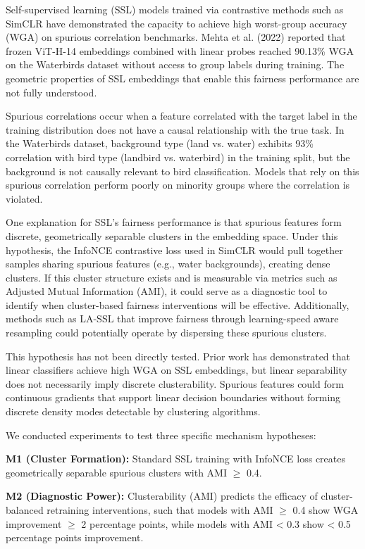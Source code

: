 
Self-supervised learning (SSL) models trained via contrastive methods such as SimCLR have demonstrated the capacity to achieve high worst-group accuracy (WGA) on spurious correlation benchmarks. Mehta et al. (2022) reported that frozen ViT-H-14 embeddings combined with linear probes reached 90.13\% WGA on the Waterbirds dataset without access to group labels during training. The geometric properties of SSL embeddings that enable this fairness performance are not fully understood.

Spurious correlations occur when a feature correlated with the target label in the training distribution does not have a causal relationship with the true task. In the Waterbirds dataset, background type (land vs. water) exhibits 93\% correlation with bird type (landbird vs. waterbird) in the training split, but the background is not causally relevant to bird classification. Models that rely on this spurious correlation perform poorly on minority groups where the correlation is violated.

One explanation for SSL's fairness performance is that spurious features form discrete, geometrically separable clusters in the embedding space. Under this hypothesis, the InfoNCE contrastive loss used in SimCLR would pull together samples sharing spurious features (e.g., water backgrounds), creating dense clusters. If this cluster structure exists and is measurable via metrics such as Adjusted Mutual Information (AMI), it could serve as a diagnostic tool to identify when cluster-based fairness interventions will be effective. Additionally, methods such as LA-SSL \citep{zhu2023la-ssl} that improve fairness through learning-speed aware resampling could potentially operate by dispersing these spurious clusters.

This hypothesis has not been directly tested. Prior work has demonstrated that linear classifiers achieve high WGA on SSL embeddings, but linear separability does not necessarily imply discrete clusterability. Spurious features could form continuous gradients that support linear decision boundaries without forming discrete density modes detectable by clustering algorithms.

We conducted experiments to test three specific mechanism hypotheses:

\textbf{M1 (Cluster Formation):} Standard SSL training with InfoNCE loss creates geometrically separable spurious clusters with AMI $\geq$ 0.4.

\textbf{M2 (Diagnostic Power):} Clusterability (AMI) predicts the efficacy of cluster-balanced retraining interventions, such that models with AMI $\geq$ 0.4 show WGA improvement $\geq$ 2 percentage points, while models with AMI < 0.3 show < 0.5 percentage points improvement.

